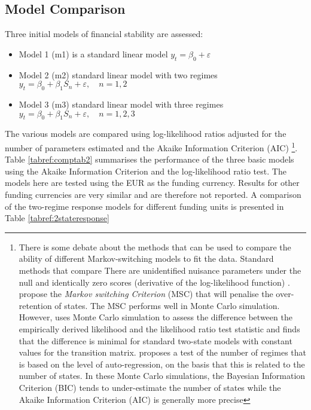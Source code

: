 \documentclass[12pt, a4paper, oneside]{article}\usepackage[]{graphicx}\usepackage[]{color}
\begin{document}
\subsection{Model Comparison}
Three initial models of financial stability are assessed: 
\begin{itemize}
\item Model 1 (m1) is a standard linear model $y_t = \beta_0  + \varepsilon$
\item Model 2 (m2) standard linear model with two regimes $y_t = \beta_0 + \beta_1 S_n + \varepsilon, \quad n = 1, 2$
\item Model 3 (m3) standard linear model with three regimes $y_t = \beta_0 + \beta_1 S_n + \varepsilon, \quad n = 1, 2, 3$
\end{itemize}

  The various models are compared using log-likelihood ratios adjusted for the number of parameters estimated and the Akaike Information Criterion (AIC) \footnote{There is some debate about the methods that can be used to compare the ability of different Markov-switching models to fit the data.  Standard methods that compare   There are unidentified nuisance parameters under the null and identically zero scores (derivative of the log-likelihood function) \citet{hansen1992likelihood}.   \citet{Smith2006553} propose the \emph{Markov switching Criterion} (MSC) that will penalise the over-retention of states.  The MSC performs well in Monte Carlo simulation.  However, \citep{garcia1998asymptotic} uses Monte Carlo simulation to assess the difference between the empirically derived likelihood and the likelihood ratio test statistic and finds that the difference is minimal for standard two-state models with constant values for the transition matrix. \citet{citeulike:13372807} proposes a test of the number of regimes that is based on the level of auto-regression, on the basis that this is related to the number of states.  In these Monte Carlo simulations, the Bayesian Information Criterion (BIC) tends to under-estimate the number of states while the Akaike Information Criterion (AIC) is generally more precise}.  Table \ref{tabref:comptab2} summarises the performance of the three basic models using the Akaike Information Criterion and the log-likelihood ratio test.  The models here are tested using the EUR as the funding currency.  Results for other funding currencies are very similar and are therefore not reported.  A comparison of the two-regime response models for different funding units is presented in Table \ref{tabref:2stateresponse} 
\end{document}
